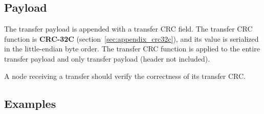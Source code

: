 \subsection{Payload}\label{sec:transport_serial_payload}

The transfer payload is appended with a transfer CRC field.
The transfer CRC function is \textbf{CRC-32C} (section~\ref{sec:appendix_crc32c}),
and its value is serialized in the little-endian byte order.
The transfer CRC function is applied to the entire transfer payload and only transfer payload (header not included).

A node receiving a transfer should verify the correctness of its transfer CRC.

\subsection{Examples}

